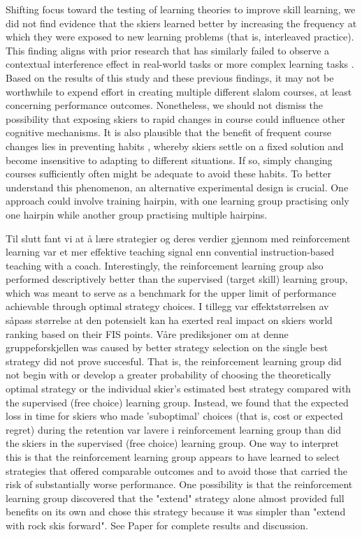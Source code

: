 Shifting focus toward the testing of learning theories to improve skill learning, we did not find evidence that the skiers learned better by increasing the frequency at which they were exposed to new learning problems (that is, interleaved practice). This finding aligns with prior research that has similarly failed to observe a contextual interference effect in real-world tasks or more complex learning tasks \cite{brady_theoretical_1998, barreiros_contextual_2007, wulf_principles_2002}. Based on the results of this study and these previous findings, it may not be worthwhile to expend effort in creating multiple different slalom courses, at least concerning performance outcomes. Nonetheless, we should not dismiss the possibility that exposing skiers to rapid changes in course could influence other cognitive mechanisms. It is also plausible that the benefit of frequent course changes lies in preventing habits \cite{du_relationship_2022}, whereby skiers settle on a fixed solution and become insensitive to adapting to different situations. If so, simply changing courses sufficiently often might be adequate to avoid these habits. To better understand this phenomenon, an alternative experimental design is crucial. One approach could involve training hairpin, with one learning group practising only one hairpin while another group practising multiple hairpins.

Til slutt fant vi at å lære strategier og deres verdier gjennom med reinforcement learning var et mer effektive teaching signal enn convential instruction-based teaching with a coach.  Interestingly, the reinforcement learning group also performed descriptively better than the supervised (target skill) learning group, which was meant to serve as a benchmark for the upper limit of performance achievable through optimal strategy choices. I tillegg var effektstørrelsen av såpass størrelse at den potensielt kan ha exerted real impact on skiers world ranking based on their FIS points. Våre prediksjoner om at denne gruppeforskjellen was caused by better strategy selection on the single best strategy did not prove succesful. That is, the reinforcement learning group did not begin with or develop a greater probability of choosing the theoretically optimal strategy or the individual skier's estimated best strategy compared with the supervised (free choice) learning group. Instead, we found that the expected loss in time for skiers who made 'suboptimal' choices (that is, cost or expected regret) during the retention var lavere i reinforcement learning group than did the skiers in the supervised (free choice) learning group. One way to interpret this is that the reinforcement learning group appears to have learned to select strategies that offered comparable outcomes and to avoid those that carried the risk of substantially worse performance. One possibility is that the reinforcement learning group discovered that the "extend" strategy alone almost provided full benefits on its own and chose this strategy because it was simpler than "extend with rock skis forward". See Paper  for complete results and discussion.

